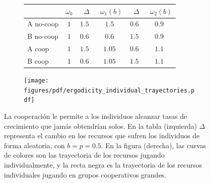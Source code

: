 \documentclass[a4paper,11pt]{book}
\theoremstyle{definition}
\begin{document}
\begin{figure}[ht!]
\vspace{-0.1cm}
\centering
 \begin{subfigure}[c]{0.50\textwidth}
 \centering
  \begin{tabular}{|l|c|c|c|c|c|}
     \hline
         & {\small $\omega_0$} & {\small \  $\Delta$}  & {\small \, $\omega_1(b)$ } & {\small \  $\Delta$}  & {\small \,  $\omega_2(b)$ }  \\ \hline \hline
        A no-coop& $1$ & $1.5$ &  $1.5$ & $0.6$ & $\bm{0.9}$ \\ \hline
        B no-coop & $1$ & $0.6$ & $0.6$ & $1.5$ & $\bm{0.9}$ \\ \hline\hline
        A coop & $1$ & $1.5$ & $1.05$ & $0.6$ & $\bm{1.1}$ \\ \hline
        B coop & $1$ & $0.6$ & $1.05$ & $1.5$ & $\bm{1.1}$\\ \hline
\end{tabular}
 \end{subfigure}
 \begin{subfigure}[c]{0.45\textwidth}
\begin{flushright}
 \texttt{[image: figures/pdf/ergodicity\_individual\_trayectories.pdf]}
 \end{flushright}
 \end{subfigure}
 \caption{
 La cooperaci\'on le permite a los individuos alcanzar tasas de crecimiento que jam\'as obtendr\'ian solos.
 En la tabla (izquierda) $\Delta$ representa el cambio en los recursos que sufren los individuos de forma aleatoria, con $b=p=0.5$.
 En la figura (derecha), las curvas de colores son las trayectoria de los recursos jugando individualmente, y la recta negra es la trayectoria de los recursos individuales jugando en grupos cooperativos grandes.
 }
 \label{fig:coop}
 \vspace{-0.1cm}
 \end{figure}

\end{document}
